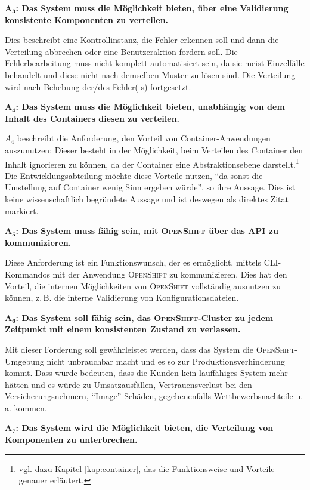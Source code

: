 \par
$\mathbf{A_{3}}$\textbf{: Das System muss die Möglichkeit bieten, über eine Validierung konsistente Komponenten zu verteilen.}
\par
Dies beschreibt eine Kontrollinstanz, die Fehler erkennen soll und dann die Verteilung abbrechen oder eine Benutzeraktion fordern soll. Die Fehlerbearbeitung muss nicht komplett automatisiert sein, da sie meist Einzelfälle behandelt und diese nicht nach demselben Muster zu lösen sind. Die Verteilung wird nach Behebung der/des Fehler(-s) fortgesetzt.
\par
$\mathbf{A_{4}}$\textbf{: Das System muss die Möglichkeit bieten, unabhängig von dem Inhalt des Containers diesen zu verteilen.}
\par
$A_{4}$ beschreibt die Anforderung, den Vorteil von Container-Anwendungen auszunutzen: Dieser besteht in der Möglichkeit, beim Verteilen des Container den Inhalt ignorieren zu können, da der Container eine Abstraktionsebene darstellt.\footnote{vgl. dazu Kapitel \vref{kap:container}, das die Funktionsweise und Vorteile genauer erläutert.} Die Entwicklungsabteilung möchte diese Vorteile nutzen, \enquote{da sonst die Umstellung auf Container wenig Sinn ergeben würde}, so ihre Aussage. Dies ist keine wissenschaftlich begründete Aussage und ist deswegen als direktes Zitat markiert.
\par
$\mathbf{A_{5}}$\textbf{: Das System muss fähig sein, mit \textsc{OpenShift} über das \ac{API} zu kommunizieren.}
\par
Diese Anforderung ist ein Funktionswunsch, der es ermöglicht, mittels \ac{CLI}-Kommandos mit der Anwendung \textsc{OpenShift} zu kommunizieren. Dies hat den Vorteil, die internen Möglichkeiten von \textsc{OpenShift} vollständig ausnutzen zu können, z.\,B. die interne Validierung von Konfigurationsdateien.
\par
$\mathbf{A_{6}}$\textbf{: Das System soll fähig sein, das \textsc{OpenShift}-Cluster zu jedem Zeitpunkt mit einem konsistenten Zustand zu verlassen.}
\par
Mit dieser Forderung soll gewährleistet werden, dass das System die \textsc{OpenShift}-Umgebung nicht unbrauchbar macht und es so zur Produktionsverhinderung kommt. Dass würde bedeuten, dass die Kunden kein lauffähiges System mehr hätten und es würde zu Umsatzausfällen, Vertrauensverlust bei den Versicherungsnehmern, \enquote{Image}-Schäden, gegebenenfalls Wettbewerbsnachteile  u.\,a. kommen. 
\par
$\mathbf{A_{7}}$\textbf{: Das System wird die Möglichkeit bieten, die Verteilung von Komponenten zu unterbrechen.}
